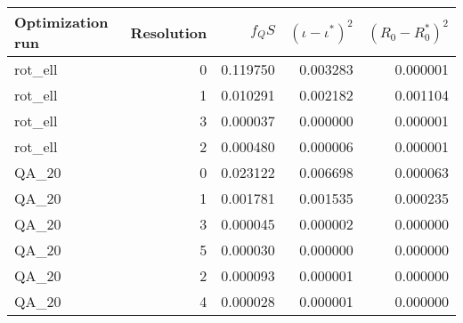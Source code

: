 \begin{tabular}{lrrrr}
\toprule
Optimization run & Resolution & $f_QS$ & $(\iota - \iota^*)^2$ & $(R_0 -R_0^*)^2$ \\
\midrule
rot_ell & 0 & 0.119750 & 0.003283 & 0.000001 \\
rot_ell & 1 & 0.010291 & 0.002182 & 0.001104 \\
rot_ell & 3 & 0.000037 & 0.000000 & 0.000001 \\
rot_ell & 2 & 0.000480 & 0.000006 & 0.000001 \\
QA_20 & 0 & 0.023122 & 0.006698 & 0.000063 \\
QA_20 & 1 & 0.001781 & 0.001535 & 0.000235 \\
QA_20 & 3 & 0.000045 & 0.000002 & 0.000000 \\
QA_20 & 5 & 0.000030 & 0.000000 & 0.000000 \\
QA_20 & 2 & 0.000093 & 0.000001 & 0.000000 \\
QA_20 & 4 & 0.000028 & 0.000001 & 0.000000 \\
\bottomrule
\end{tabular}

